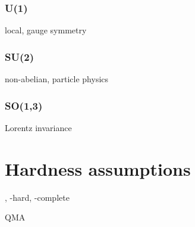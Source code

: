 \subsubsection{U(1)}
\cite{kogutIntroductionLatticeGauge1979}
local, gauge symmetry

\subsubsection{SU(2)}
non-abelian, particle physics

\subsubsection{SO(1,3)}
Lorentz invariance


\section{Hardness assumptions}
\begin{definition}[\NP]\label{def:np}
	\NP, \NP-hard, \NP-complete
\end{definition}
\begin{definition}[\sharpP]\label{def:sharpp}
	\sharpP
\end{definition}
\begin{definition}[QMA]\label{def:qma}
	QMA
\end{definition}
\begin{definition}[\BPP]\label{def:bpp}
	\BPP
\end{definition}
\begin{definition}[\BQP]\label{def:bqp}
	\BQP
\end{definition}